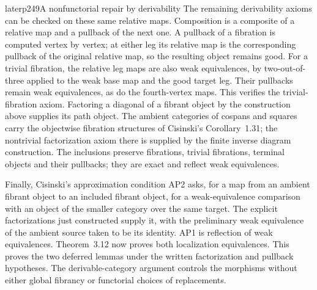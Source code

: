 \begin{dcomment}{later}{p249}{A nonfunctorial repair by derivability}
The remaining derivability axioms can be checked on these same relative maps. Composition is a composite of a relative map and a pullback of the next one. A pullback of a fibration is computed vertex by vertex; at either leg its relative map is the corresponding pullback of the original relative map, so the resulting object remains good. For a trivial fibration, the relative leg maps are also weak equivalences, by two-out-of-three applied to the weak base map and the good target leg. Their pullbacks remain weak equivalences, as do the fourth-vertex maps. This verifies the trivial-fibration axiom. Factoring a diagonal of a fibrant object by the construction above supplies its path object. The ambient categories of cospans and squares carry the objectwise fibration structures of Cisinski's Corollary~1.31; the nontrivial factorization axiom there is supplied by the finite inverse diagram construction. The inclusions preserve fibrations, trivial fibrations, terminal objects and their pullbacks; they are exact and reflect weak equivalences.

Finally, Cisinski's approximation condition AP2 asks, for a map from an ambient fibrant object to an included fibrant object, for a weak-equivalence comparison with an object of the smaller category over the same target. The explicit factorizations just constructed supply it, with the preliminary weak equivalence of the ambient source taken to be its identity. AP1 is reflection of weak equivalences. Theorem~3.12 now proves both localization equivalences. This proves the two deferred lemmas under the written factorization and pullback hypotheses. The derivable-category argument controls the morphisms without either global fibrancy or functorial choices of replacements.
\end{dcomment}

